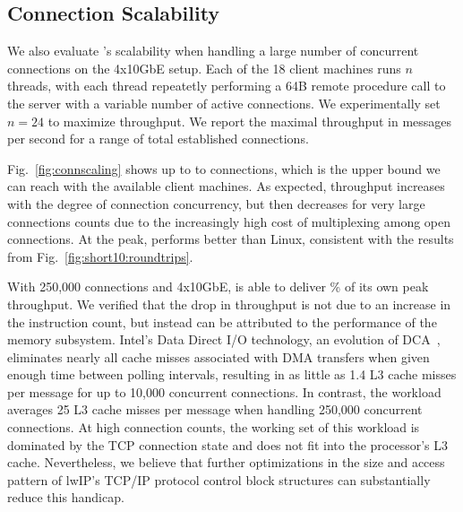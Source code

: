 \subsection{Connection Scalability}

\label{sec:eval:scale}

We also evaluate \ix's scalability when handling a large number of
concurrent connections on the 4x10GbE setup. Each of the 18 client
machines runs $n$ threads, with each thread repeatetly performing a
64B remote procedure call to the server with a variable number of
active connections. %
We experimentally set $n=24$ to maximize
throughput.  We report the maximal throughput in messages per second
for a range of total established connections.



Fig.~\ref{fig:connscaling} shows up to to 
connections, which is the upper bound we can reach with the available
client machines.  As expected, throughput increases with the degree of
connection concurrency, but then decreases for very large connections
counts due to the increasingly high cost of multiplexing among open
connections.  At the peak, \ix performs  better than
Linux, consistent with the results from
Fig.~\ref{fig:short10:roundtrips}.

With 250,000 connections and 4x10GbE, \ix is able to deliver
\% of its own peak throughput.  We verified that the drop
in throughput is not due to an increase in the instruction count, but
instead can be attributed to the performance of the memory
subsystem. Intel's Data Direct I/O technology, an evolution of
DCA~\cite{DBLP:conf/isca/HuggahalliIT05}, eliminates nearly all cache
misses associated with DMA transfers when given enough time between
polling intervals, resulting in as little as 1.4 L3 cache misses per
message for up to 10,000 concurrent connections.  In contrast, the
workload averages 25 L3 cache misses per message when handling 250,000
concurrent connections.  At high connection counts, the working set of
this workload is dominated by the TCP connection state and does not
fit into the processor's L3 cache.  Nevertheless, we believe that
further optimizations in the size and access pattern of lwIP's TCP/IP
protocol control block structures can substantially reduce this
handicap.
  



